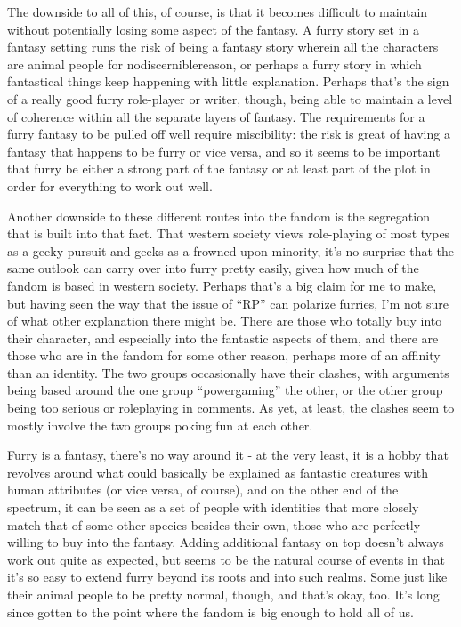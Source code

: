 The downside to all of this, of course, is that it becomes difficult to maintain without potentially losing some aspect of the fantasy. A furry story set in a fantasy setting runs the risk of being a fantasy story wherein all the characters are animal people for nodiscerniblereason, or perhaps a furry story in which fantastical things keep happening with little explanation. Perhaps that's the sign of a really good furry role-player or writer, though, being able to maintain a level of coherence within all the separate layers of fantasy. The requirements for a furry fantasy to be pulled off well require miscibility: the risk is great of having a fantasy that happens to be furry or vice versa, and so it seems to be important that furry be either a strong part of the fantasy or at least part of the plot in order for everything to work out well.

Another downside to these different routes into the fandom is the segregation that is built into that fact. That western society views role-playing of most types as a geeky pursuit and geeks as a frowned-upon minority, it's no surprise that the same outlook can carry over into furry pretty easily, given how much of the fandom is based in western society. Perhaps that's a big claim for me to make, but having seen the way that the issue of ``RP'' can polarize furries, I'm not sure of what other explanation there might be. There are those who totally buy into their character, and especially into the fantastic aspects of them, and there are those who are in the fandom for some other reason, perhaps more of an affinity than an identity. The two groups occasionally have their clashes, with arguments being based around the one group ``powergaming'' the other, or the other group being too serious or roleplaying in comments. As yet, at least, the clashes seem to mostly involve the two groups poking fun at each other.

Furry is a fantasy, there's no way around it - at the very least, it is a hobby that revolves around what could basically be explained as fantastic creatures with human attributes (or vice versa, of course), and on the other end of the spectrum, it can be seen as a set of people with identities that more closely match that of some other species besides their own, those who are perfectly willing to buy into the fantasy. Adding additional fantasy on top doesn't always work out quite as expected, but seems to be the natural course of events in that it's so easy to extend furry beyond its roots and into such realms. Some just like their animal people to be pretty normal, though, and that's okay, too. It's long since gotten to the point where the fandom is big enough to hold all of us.
